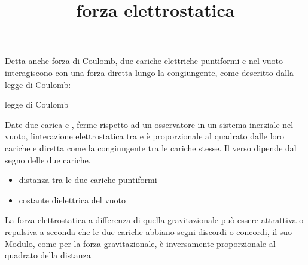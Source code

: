 \documentclass[
]{article}
\title{forza elettrostatica}
\author{}
\date{}
\providecommand{\tightlist}{%
  \setlength{\itemsep}{0pt}\setlength{\parskip}{0pt}}
\begin{document}
\maketitle

Detta anche forza di Coulomb, due cariche elettriche puntiformi {} e {}
nel vuoto interagiscono con una forza diretta lungo la congiungente,
come descritto dalla legge di Coulomb:

legge di Coulomb

Date due carica {} e {}, ferme rispetto ad un osservatore in un sistema
inerziale nel vuoto, l\textquotesingle interazione elettrostatica tra {}
e {} è proporzionale al quadrato dalle loro cariche e diretta come la
congiungente tra le cariche stesse. Il verso dipende dal segno delle due
cariche.

\begin{itemize}
\tightlist
\item
  {} distanza tra le due cariche puntiformi
\item
  {} costante dielettrica del vuoto
\end{itemize}

La forza elettrostatica a differenza di quella gravitazionale può essere
attrattiva o repulsiva a seconda che le due cariche abbiano segni
discordi o concordi, il suo Modulo, come per la forza gravitazionale, è
inversamente proporzionale al quadrato della distanza
\end{document}

